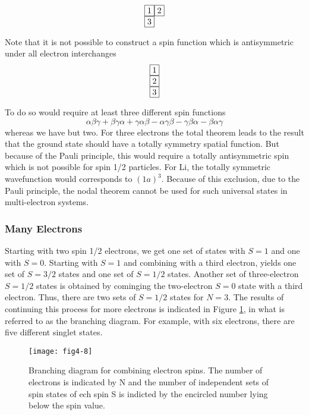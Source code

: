 \begin{equation}
\begin{tabular}{l}
\fbox{1}\fbox{2} \\
\fbox{3}
\end{tabular}
\end{equation}

Note that it is not possible to construct a spin function which is 
antisymmetric under all electron interchanges
\begin{equation}
\begin{tabular}{l}
\fbox{1}\\
\fbox{2}\\
\fbox{3}
\end{tabular}
\end{equation}

\noindent
To do so would require at least three different spin functions
\begin{equation}
\alpha \beta \gamma + \beta \gamma \alpha + \gamma \alpha \beta - 
\alpha \gamma \beta - \gamma \beta \alpha - \beta \alpha \gamma
\end{equation}
whereas we have but two. For three electrons the total theorem leads to 
the result that the ground state should have a totally symmetry 
spatial function. But because of the Pauli principle, this would 
require a totally antisymmetric spin which is not possible
for spin 1/2 particles.   For Li, the totally symmetric wavefunction 
would corresponds to $(1a)^3$.  Because of this exclusion, due to the 
Pauli principle, the nodal theorem cannot be used for
such universal states in multi-electron systems.

\subsubsection{Many Electrons}

Starting with two spin 1/2 electrons, we get one set of states with $S
= 1$ and one with $S = 0$.  Starting with $S = 1$ and combining with a
third electron, yields one set of $S = 3/2$ states and one set of $S =
1/2$ states.  Another set of three-electron $S = 1/2$ states is
obtained by cominging the two-electron $S = 0$ state with a third
electron.  Thus, there are two sets of $S = 1/2$ states for $N = 3$.
The results of continuing this process for more electrons is indicated
in Figure \ref{fig4-02}, in what is referred to as the branching
diagram. For example, with six electrons, there are five different
singlet states.

\begin{figure}
\texttt{[image: fig4-8]}
\caption{Branching diagram for combining electron spins.  The 
number of electrons is indicated by N and the number of independent 
sets of spin states of ech spin S is indicted by the encircled number 
lying below the spin value.}
\label{fig4-02}
\end{figure}


